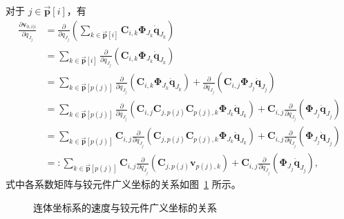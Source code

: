 对于 $j \in \vec{\boldsymbol{p}}[i]$，有
\begin{equation}\label{eq:11.11}
\begin{aligned}
\frac{\partial \boldsymbol{v}_{0,i|i}}{\partial q_{J_j}}
&= \frac{\partial}{\partial q_{J_j}} \left( \sum_{k \in \vec{\boldsymbol{p}}[i]} \boldsymbol{C}_{i,k} \boldsymbol{\Phi}_{J_k} \dot{\boldsymbol{q}}_{J_k} \right) \\
&= \sum_{k \in \vec{\boldsymbol{p}}[i]} \frac{\partial}{\partial q_{J_j}} \left( \boldsymbol{C}_{i,k} \boldsymbol{\Phi}_{J_k} \dot{\boldsymbol{q}}_{J_k} \right) \\
&= \sum_{k \in \vec{\boldsymbol{p}}[p(j)]} \frac{\partial}{\partial q_{J_j}} \left( \boldsymbol{C}_{i,k} \boldsymbol{\Phi}_{J_k} \dot{\boldsymbol{q}}_{J_k} \right) + \frac{\partial}{\partial q_{J_j}} \left( \boldsymbol{C}_{i,j} \boldsymbol{\Phi}_{J_j} \dot{\boldsymbol{q}}_{J_j} \right) \\
&= \sum_{k \in \vec{\boldsymbol{p}}[p(j)]} \frac{\partial}{\partial q_{J_j}} \left( \boldsymbol{C}_{i,j} \boldsymbol{C}_{j,p(j)} \boldsymbol{C}_{p(j),k} \boldsymbol{\Phi}_{J_k} \dot{\boldsymbol{q}}_{J_k} \right) + \boldsymbol{C}_{i,j} \frac{\partial}{\partial q_{J_j}} \left( \boldsymbol{\Phi}_{J_j} \dot{\boldsymbol{q}}_{J_j} \right) \\
&= \sum_{k \in \vec{\boldsymbol{p}}[p(j)]} \boldsymbol{C}_{i,j} \frac{\partial}{\partial q_{J_j}} \left( \boldsymbol{C}_{j,p(j)} \boldsymbol{C}_{p(j),k} \boldsymbol{\Phi}_{J_k} \dot{\boldsymbol{q}}_{J_k} \right) + \boldsymbol{C}_{i,j} \frac{\partial}{\partial q_{J_j}} \left( \boldsymbol{\Phi}_{J_j} \dot{\boldsymbol{q}}_{J_j} \right) \\
&=: \sum_{k \in \vec{\boldsymbol{p}}[p(j)]} \boldsymbol{C}_{i,j} \frac{\partial}{\partial q_{J_j}} \left( \boldsymbol{C}_{j,p(j)} \boldsymbol{v}_{p(j),k} \right) + \boldsymbol{C}_{i,j} \frac{\partial}{\partial q_{J_j}} \left( \boldsymbol{\Phi}_{J_j} \dot{\boldsymbol{q}}_{J_j} \right),
\end{aligned}
\end{equation}
式中各系数矩阵与铰元件广义坐标的关系如图~\ref{fig:11.1} 所示。

\begin{figure}[htbp]
\centering
\caption{连体坐标系的速度与铰元件广义坐标的关系}
\label{fig:11.1}
\end{figure}

